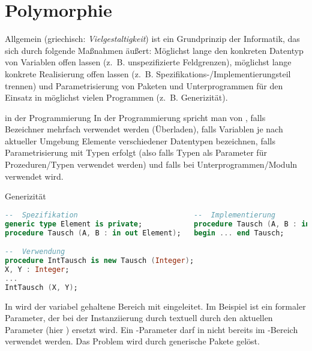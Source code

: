 \pagebreak

\section{%
    Polymorphie%
}

\begin{Def}{Allgemein}
     (griechisch: \emph{Vielgestaltigkeit}) ist ein
    Grundprinzip der Informatik, das sich durch folgende Maßnahmen äußert:
    Möglichst lange den konkreten Datentyp von Variablen offen lassen
    (z.~B. unspezifizierte Feldgrenzen), möglichst lange konkrete
    Realisierung offen lassen (z.~B. Spezifikations-/Implementierungsteil
    trennen) und Parametrisierung von Paketen und Unterprogrammen für den
    Einsatz in möglichst vielen Programmen (z.~B. Generizität).
\end{Def}

\begin{Def}{in der Programmierung}
    In der Programmierung spricht man von , falls
    Bezeichner mehrfach verwendet werden (Überladen), falls
    Variablen je nach aktueller Umgebung Elemente verschiedener Datentypen
    bezeichnen, falls Parametrisierung mit Typen erfolgt (also falls Typen als
    Parameter für Prozeduren/Typen verwendet werden) und falls
     bei Unterprogrammen/Moduln verwendet wird.
\end{Def}

\begin{Def}{Generizität}
\begin{lstlisting}[language=ada]
--  Spezifikation                           --  Implementierung
generic type Element is private;            procedure Tausch (A, B : in out Element) is ...
procedure Tausch (A, B : in out Element);   begin ... end Tausch;

--  Verwendung
procedure IntTausch is new Tausch (Integer);
X, Y : Integer;
...
IntTausch (X, Y);
\end{lstlisting}
    In \Ada{} wird der variabel gehaltene Bereich mit 
    eingeleitet.
    Im Beispiel ist  ein formaler Parameter, der bei der
    Instanziierung durch  textuell durch den aktuellen
    Parameter (hier ) ersetzt wird.
    Ein -Parameter darf in \Ada{} nicht bereits im
    -Bereich verwendet werden.
    Das Problem wird durch generische Pakete gelöst.
\end{Def}

